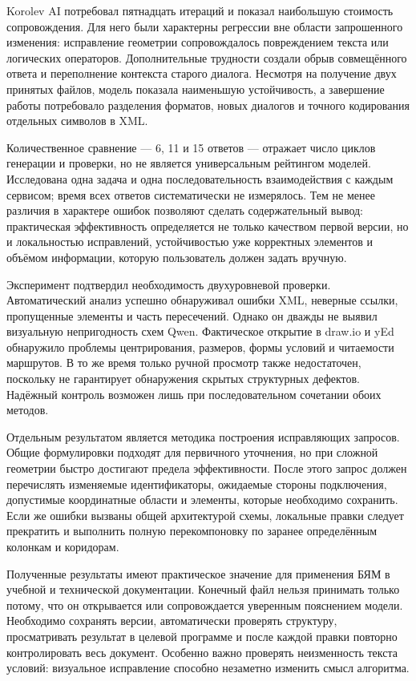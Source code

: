 \documentclass[a4paper,12pt]{extreport}
\begin{document}
Korolev AI потребовал пятнадцать итераций и показал наибольшую стоимость сопровождения. Для него были характерны регрессии вне области запрошенного изменения: исправление геометрии сопровождалось повреждением текста или логических операторов. Дополнительные трудности создали обрыв совмещённого ответа и переполнение контекста старого диалога. Несмотря на получение двух принятых файлов, модель показала наименьшую устойчивость, а завершение работы потребовало разделения форматов, новых диалогов и точного кодирования отдельных символов в XML.

Количественное сравнение --- 6, 11 и 15 ответов --- отражает число циклов генерации и проверки, но не является универсальным рейтингом моделей. Исследована одна задача и одна последовательность взаимодействия с каждым сервисом; время всех ответов систематически не измерялось. Тем не менее различия в характере ошибок позволяют сделать содержательный вывод: практическая эффективность определяется не только качеством первой версии, но и локальностью исправлений, устойчивостью уже корректных элементов и объёмом информации, которую пользователь должен задать вручную.

Эксперимент подтвердил необходимость двухуровневой проверки. Автоматический анализ успешно обнаруживал ошибки XML, неверные ссылки, пропущенные элементы и часть пересечений. Однако он дважды не выявил визуальную непригодность схем Qwen. Фактическое открытие в draw.io и yEd обнаружило проблемы центрирования, размеров, формы условий и читаемости маршрутов. В то же время только ручной просмотр также недостаточен, поскольку не гарантирует обнаружения скрытых структурных дефектов. Надёжный контроль возможен лишь при последовательном сочетании обоих методов.

Отдельным результатом является методика построения исправляющих запросов. Общие формулировки подходят для первичного уточнения, но при сложной геометрии быстро достигают предела эффективности. После этого запрос должен перечислять изменяемые идентификаторы, ожидаемые стороны подключения, допустимые координатные области и элементы, которые необходимо сохранить. Если же ошибки вызваны общей архитектурой схемы, локальные правки следует прекратить и выполнить полную перекомпоновку по заранее определённым колонкам и коридорам.

Полученные результаты имеют практическое значение для применения БЯМ в учебной и технической документации. Конечный файл нельзя принимать только потому, что он открывается или сопровождается уверенным пояснением модели. Необходимо сохранять версии, автоматически проверять структуру, просматривать результат в целевой программе и после каждой правки повторно контролировать весь документ. Особенно важно проверять неизменность текста условий: визуальное исправление способно незаметно изменить смысл алгоритма.
\end{document}
